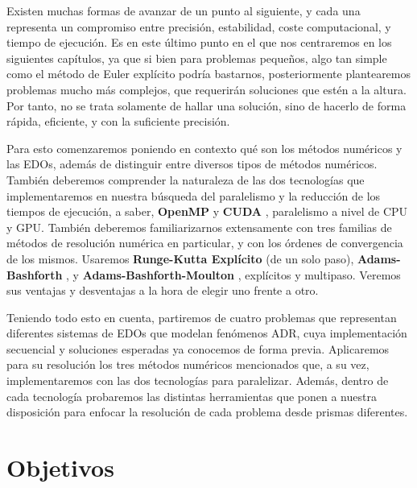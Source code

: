 Existen muchas formas de avanzar de un punto al siguiente, y cada una representa un compromiso entre precisión, estabilidad, coste computacional, y tiempo de ejecución. Es en este último punto en el que nos centraremos en los siguientes capítulos, ya que si bien para problemas pequeños, algo tan simple como el método de Euler explícito \cite{Gallardo2018} podría bastarnos, posteriormente plantearemos problemas mucho más complejos, que requerirán soluciones que estén a la altura. Por tanto, no se trata solamente de hallar una solución, sino de hacerlo de forma rápida, eficiente, y con la suficiente precisión.

Para esto comenzaremos poniendo en contexto qué son los métodos numéricos y las EDOs, además de distinguir entre diversos tipos de métodos numéricos. También deberemos comprender la naturaleza de las dos tecnologías que implementaremos en nuestra búsqueda del paralelismo y la reducción de los tiempos de ejecución, a saber, \textbf{OpenMP} \cite{Jin2024} y \textbf{CUDA} \cite{Kirk2010}, paralelismo a nivel de CPU y GPU. También deberemos familiarizarnos extensamente con tres familias de métodos de resolución numérica en particular, y con los órdenes de convergencia de los mismos. Usaremos \textbf{Runge-Kutta Explícito} \cite{Segarra-Escandon2020} (de un solo paso), \textbf{Adams-Bashforth}  \cite{Molero2007}, y \textbf{Adams-Bashforth-Moulton} \cite{Burden2016}, explícitos y multipaso. Veremos sus ventajas y desventajas a la hora de elegir uno frente a otro.

Teniendo todo esto en cuenta, partiremos de cuatro problemas que representan diferentes sistemas de EDOs que modelan fenómenos ADR, cuya implementación secuencial y soluciones esperadas ya conocemos de forma previa. Aplicaremos para su resolución los tres métodos numéricos mencionados que, a su vez, implementaremos con las dos tecnologías para paralelizar. Además, dentro de cada tecnología probaremos las distintas herramientas que ponen a nuestra disposición para enfocar la resolución de cada problema desde prismas diferentes. 

\section{Objetivos}

